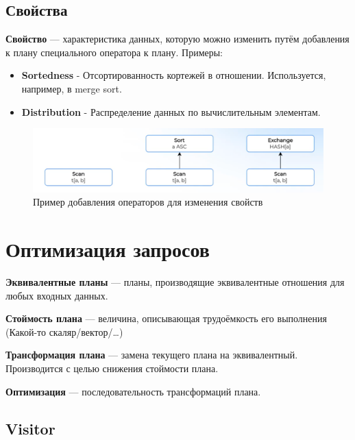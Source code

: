 \documentclass[11pt]{article}
\begin{document}
    \subsection*{Свойства}

    \textbf{Свойство} --- характеристика данных, которую можно изменить путём добавления к плану специального оператора к плану.
    Примеры:

    \begin{itemize}
        \item \textbf{Sortedness} - Отсортированность кортежей в отношении.
        Используется, например, в merge sort.
        \item \textbf{Distribution} - Распределение данных по вычислительным элементам.
    \end{itemize}

    \begin{figure}[h!]
        \centering
        \includegraphics[width=\textwidth]{Pictures/Metadata/Изменение свойств}
        \caption{Пример добавления операторов для изменения свойств}
        \label{fig:properties}
    \end{figure}

    \section*{Оптимизация запросов}
    \newline
    \textbf{Эквивалентные планы} --- планы, производящие эквивалентные отношения для любых входных данных.

    \textbf{Стоймость плана} --- величина, описывающая трудоёмкость его выполнения (Какой-то скаляр/вектор/\ldots)

    \textbf{Трансформация плана} --- замена текущего плана на эквивалентный.
    Производится с целью снижения стоймости плана.

    \textbf{Оптимизация} --- последовательность трансформаций плана.

    \subsection*{Visitor}
\end{document}
